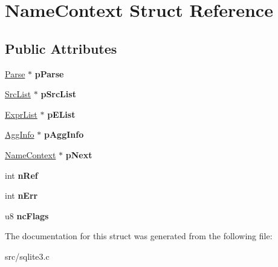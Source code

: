 \hypertarget{struct_name_context}{\section{Name\-Context Struct Reference}
\label{struct_name_context}
}
\subsection*{Public Attributes}
\begin{DoxyCompactItemize}
\item 
\hypertarget{struct_name_context_a14635249bf75d5e18124089571dd2386}{\hyperlink{struct_parse}{Parse} $\ast$ {\bfseries p\-Parse}}\label{struct_name_context_a14635249bf75d5e18124089571dd2386}

\item 
\hypertarget{struct_name_context_a6ede21da33e2e9bd3d0c5fe90a3ec72c}{\hyperlink{struct_src_list}{Src\-List} $\ast$ {\bfseries p\-Src\-List}}\label{struct_name_context_a6ede21da33e2e9bd3d0c5fe90a3ec72c}

\item 
\hypertarget{struct_name_context_a8c752d7fb9b28179156c569cc57ba6f2}{\hyperlink{struct_expr_list}{Expr\-List} $\ast$ {\bfseries p\-E\-List}}\label{struct_name_context_a8c752d7fb9b28179156c569cc57ba6f2}

\item 
\hypertarget{struct_name_context_aeb3ff72c03dd770d421cadc2195a5644}{\hyperlink{struct_agg_info}{Agg\-Info} $\ast$ {\bfseries p\-Agg\-Info}}\label{struct_name_context_aeb3ff72c03dd770d421cadc2195a5644}

\item 
\hypertarget{struct_name_context_a82ce0ec8a3cc3d792e1f38bb5e0ad5fc}{\hyperlink{struct_name_context}{Name\-Context} $\ast$ {\bfseries p\-Next}}\label{struct_name_context_a82ce0ec8a3cc3d792e1f38bb5e0ad5fc}

\item 
\hypertarget{struct_name_context_ad68616ce2a58fa1b135e0dcf953bdc97}{int {\bfseries n\-Ref}}\label{struct_name_context_ad68616ce2a58fa1b135e0dcf953bdc97}

\item 
\hypertarget{struct_name_context_aba0b89b42e945c4c96d57a8fe011329c}{int {\bfseries n\-Err}}\label{struct_name_context_aba0b89b42e945c4c96d57a8fe011329c}

\item 
\hypertarget{struct_name_context_a3dcc2e5442b6a74440a15226139b78d2}{u8 {\bfseries nc\-Flags}}\label{struct_name_context_a3dcc2e5442b6a74440a15226139b78d2}

\end{DoxyCompactItemize}


The documentation for this struct was generated from the following file\-:\begin{DoxyCompactItemize}
\item 
src/sqlite3.\-c\end{DoxyCompactItemize}

